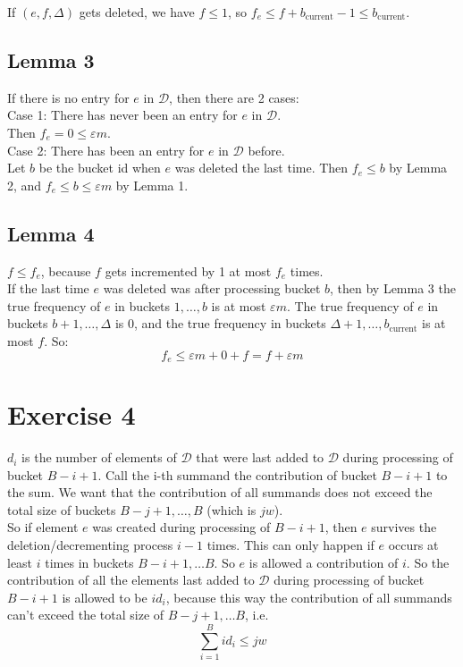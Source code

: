 \documentclass{article}
\begin{document}
If $(e, f, \Delta)$ gets deleted, we have $f \leq 1$, so $f_e \leq f+b_{\text{current}}-1 \leq b_{\text{current}}$.

\subsection*{Lemma 3}
If there is no entry for $e$ in $\mathcal{D}$, then there are 2 cases:\\
Case 1: There has never been an entry for $e$ in $\mathcal{D}$. \\
Then $f_e = 0 \leq \varepsilon m$.\\
Case 2: There has been an entry for $e$ in $\mathcal{D}$ before.\\
Let $b$ be the bucket id when $e$ was deleted the last time. Then $f_e \leq b$ by Lemma 2, and $f_e \leq b \leq \varepsilon m $ by Lemma 1.

\subsection*{Lemma 4}
$f \leq f_e$, because $f$ gets incremented by 1 at most $f_e$ times. \\
If the last time $e$ was deleted was after processing bucket $b$, then by Lemma 3 the true frequency of $e$ in buckets
$1, \hdots, b$ is at most $\varepsilon m$. The true frequency of $e$ in buckets
$b+1, \hdots, \Delta$ is 0, and the true frequency in buckets
$\Delta+1, \hdots, b_{\text{current}}$ is  at most $f$. So:
\[
f_e \leq \varepsilon m + 0 + f = f + \varepsilon m
\]

\newpage
\section*{Exercise 4}
$d_i$ is the number of elements of $\mathcal{D}$ that were last added to $\mathcal{D}$ during processing of bucket $B-i+1$. Call the i-th summand the contribution of bucket $B-i+1$ to the sum. We want that the contribution of all summands does not exceed the total size of buckets $B-j+1, \hdots, B$ (which is $jw$). \\

So if element $e$ was created during processing of $B-i+1$, then $e$ survives the
deletion/decrementing process $i-1$ times. This can only happen if $e$ occurs at least $i$ times in buckets $B-i+1, \hdots B$. So $e$ is allowed a contribution of $i$. So the contribution of all the elements last added to $\mathcal{D}$ during processing of bucket $B-i+1$ is allowed to be $id_i$, because this way the contribution of all summands can't exceed the total size of $B-j+1, \hdots B$, i.e.
\[
\sum_{i=1}^B id_i \leq jw
\]
\end{document}
